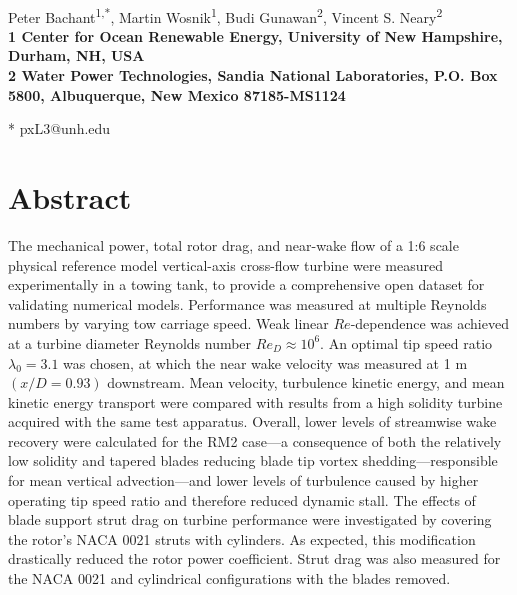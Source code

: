 \documentclass[10pt,letterpaper]{article}
\date{}
\begin{document}
\linenumbers
\vspace*{0.35in}

\begin{flushleft}

{\Large \textbf{}} \newline %
\\ Peter Bachant\textsuperscript{1,*}, Martin Wosnik\textsuperscript{1}, Budi
Gunawan\textsuperscript{2}, Vincent S. Neary\textsuperscript{2} \\ \bigskip
\bf{1} Center for Ocean Renewable Energy, University of New Hampshire, Durham,
NH, USA \\ \bf{2} Water Power Technologies, Sandia National Laboratories, P.O.
Box 5800, Albuquerque, New Mexico 87185-MS1124 \\ \bigskip

* pxL3@unh.edu

\end{flushleft}

\section*{Abstract}

The mechanical power, total rotor drag, and near-wake flow of a 1:6 scale
physical reference model vertical-axis cross-flow turbine were measured
experimentally in a towing tank, to provide a comprehensive open dataset for
validating numerical models. Performance was measured at multiple Reynolds
numbers by varying tow carriage speed. Weak linear $Re$-dependence was achieved
at a turbine diameter Reynolds number $Re_D \approx 10^6$. An optimal tip speed
ratio $\lambda_0 = 3.1$ was chosen, at which the near wake velocity was measured
at 1 m $(x/D=0.93)$ downstream. Mean velocity, turbulence kinetic energy, and
mean kinetic energy transport were compared with results from a high solidity
turbine acquired with the same test apparatus. Overall, lower levels of
streamwise wake recovery were calculated for the RM2 case---a consequence of
both the relatively low solidity and tapered blades reducing blade tip vortex
shedding---responsible for mean vertical advection---and lower levels of
turbulence caused by higher operating tip speed ratio and therefore reduced
dynamic stall. The effects of blade support strut drag on turbine performance
were investigated by covering the rotor's NACA 0021 struts with cylinders. As
expected, this modification drastically reduced the rotor power coefficient.
Strut drag was also measured for the NACA 0021 and cylindrical configurations
with the blades removed.
\end{document}
